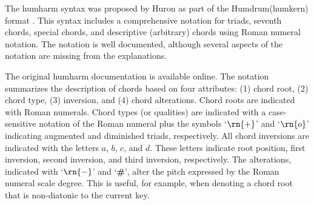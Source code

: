 

The \gls{humharm} syntax was proposed by Huron as part of
the Humdrum(\gls{humkern}) format
\parencite{huron1994humdrum}. This syntax includes a
comprehensive notation for triads, seventh chords, special
chords, and descriptive (arbitrary) chords using Roman
numeral notation. The notation is well documented, although
several aspects of the notation are missing from the
explanations.

The original \gls{humharm} documentation is available
online.
The notation summarizes the description of chords based on
four attributes: (1) chord root, (2) chord type, (3)
inversion, and (4) chord alterations. Chord roots are
indicated with Roman numerals. Chord types (or qualities)
are indicated with a case-sensitive notation of the Roman
numeral plus the symbols `$\rn{+}$' and `$\rn{o}$'
indicating augmented and diminished triads, respectively.
All chord inversions are indicated with the letters $a$,
$b$, $c$, and $d$. These letters indicate root position,
first inversion, second inversion, and third inversion,
respectively. The alterations, indicated with `$\rn{-}$' and
`\textbf{\#}', alter the pitch expressed by the Roman
numeral scale degree. This is useful, for example, when
denoting a chord root that is non-diatonic to the current
key.
